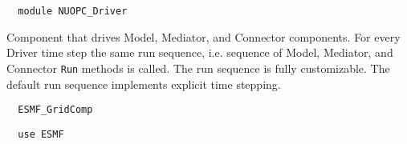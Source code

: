  
\setlength{\parskip}{0pt}
\setlength{\parindent}{0pt}
\setlength{\baselineskip}{11pt}
 
\def\bv{\begin{verbatim}}
\def\ev{\end{verbatim}}
\def\be{\begin{equation}}
\def\ee{\end{equation}}
\def\bea{\begin{eqnarray}}
\def\eea{\end{eqnarray}}
\def\bi{\begin{itemize}}
\def\ei{\end{itemize}}
\def\bn{\begin{enumerate}}
\def\en{\end{enumerate}}
\def\bd{\begin{description}}
\def\ed{\end{description}}
\def\({\left (}
\def\){\right )}
\def\[{\left [}
\def\]{\right ]}
\def\<{\left  \langle}
\def\>{\right \rangle}
\def\cI{{\cal I}}
\def\diag{\mathop{\rm diag}}
\def\tr{\mathop{\rm tr}}


\begin{verbatim}  module NUOPC_Driver
\end{verbatim}

Component that drives Model, Mediator, and Connector components. For every Driver time step the same run sequence, i.e. sequence of Model, Mediator, and Connector {\tt Run} methods is called. The run sequence is fully customizable. The default run sequence implements explicit time stepping.

\begin{verbatim}  ESMF_GridComp
\end{verbatim}

\begin{verbatim}  use ESMF
\end{verbatim}

